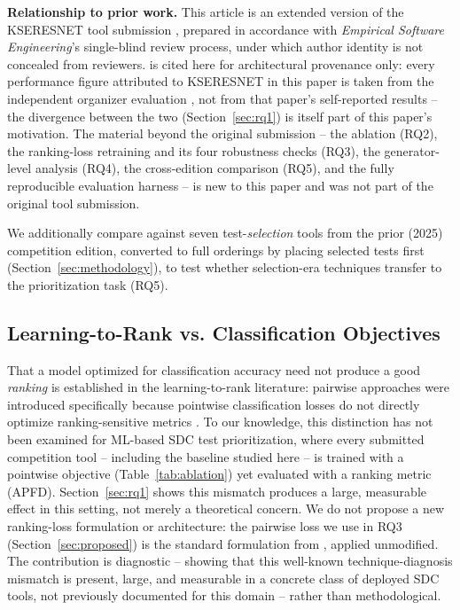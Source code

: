 \documentclass[smallextended]{svjour3}
\begin{document}
\textbf{Relationship to prior work.} This article is an extended version of
the KSERESNET tool submission \citep{swain2026kseresnet}, prepared in
accordance with \textit{Empirical Software Engineering}'s single-blind
review process, under which author identity is not concealed from
reviewers. \citet{swain2026kseresnet} is cited here for architectural
provenance only: every performance figure attributed to KSERESNET in this
paper is taken from the independent organizer evaluation
\citep{aryan2026icst}, not from that paper's self-reported results -- the
divergence between the two (Section~\ref{sec:rq1}) is itself part of this
paper's motivation. The material beyond the original submission --
the ablation (RQ2), the ranking-loss retraining and its four robustness
checks (RQ3), the generator-level analysis (RQ4), the cross-edition
comparison (RQ5), and the fully reproducible evaluation harness -- is new
to this paper and was not part of the original tool submission.

We additionally compare against seven test-\emph{selection} tools from the
prior (2025) competition edition, converted to full orderings by placing
selected tests first (Section~\ref{sec:methodology}), to test whether
selection-era techniques transfer to the prioritization task (RQ5).

\subsection{Learning-to-Rank vs. Classification Objectives}
That a model optimized for classification accuracy need not produce a good
\emph{ranking} is established in the learning-to-rank literature: pairwise
approaches were introduced specifically because pointwise classification
losses do not directly optimize ranking-sensitive metrics
\citep{burges2005learning}. To our knowledge, this distinction has not
been examined for ML-based SDC test prioritization, where every submitted
competition tool -- including the baseline studied here -- is trained with
a pointwise objective (Table~\ref{tab:ablation}) yet evaluated with a
ranking metric (APFD). Section~\ref{sec:rq1} shows this mismatch produces a
large, measurable effect in this setting, not merely a theoretical concern.
We do not propose a new ranking-loss formulation or architecture: the
pairwise loss we use in RQ3 (Section~\ref{sec:proposed}) is the standard
formulation from \citet{burges2005learning}, applied unmodified. The
contribution is diagnostic -- showing that this well-known
technique-diagnosis mismatch is present, large, and measurable in a
concrete class of deployed SDC tools, not previously documented for this
domain -- rather than methodological.
\end{document}
